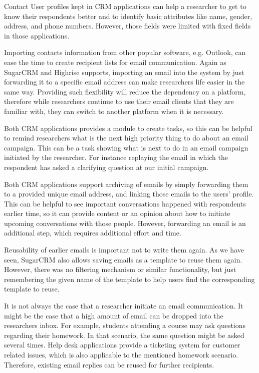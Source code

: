 \begin{compactitem}
	\item Contact User profiles kept in \ac{CRM} applications can help a researcher to get to know their respondents better and to identify basic attributes like name, gender, address, and phone numbers. However, those fields were limited with fixed fields in those applications.
	\item Importing contacts information from other popular software, e.g. Outlook, can ease the time to create recipient lists for email communication. Again as SugarCRM and Highrise supports, importing an email into the system by just forwarding it to a specific email address can make researchers life easier in the same way. Providing such flexibility will reduce the dependency on a platform, therefore while researchers continue to use their email clients that they are familiar with, they can switch to another platform when it is necessary.
	\item Both \ac{CRM} applications provides a module to create tasks, so this can be helpful to remind researchers what is the next high priority thing to do about an email campaign. This can be a task showing what is next to do in an email campaign initiated by the researcher. For instance replaying the email in which the respondent has asked a clarifying question at our initial campaign.
	\item Both \ac{CRM} applications support archiving of emails by simply forwarding them to a provided unique email address, and linking those emails to the users' profile. This can be helpful to see important conversations happened with respondents earlier time, so it can provide content or an opinion about how to initiate upcoming conversations with those people. However, forwarding an email is an additional step, which requires additional effort and time.
	\item Reusability of earlier emails is important not to write them again. As we have seen, SugarCRM also allows saving emails as a template to reuse them again. However, there was no filtering mechanism or similar functionality, but just remembering the given name of the template to help users find the corresponding template to reuse.
	\item It is not always the case that a researcher initiate an email communication. It might be the case that a high amount of email can be dropped into the researchers inbox. For example, students attending a course may ask questions regarding their homework. In that scenario, the same question might be asked several times. Help desk applications provide a ticketing system for customer related issues, which is also applicable to the mentioned homework scenario. Therefore, existing email replies can be reused for further recipients.

\end{compactitem}
